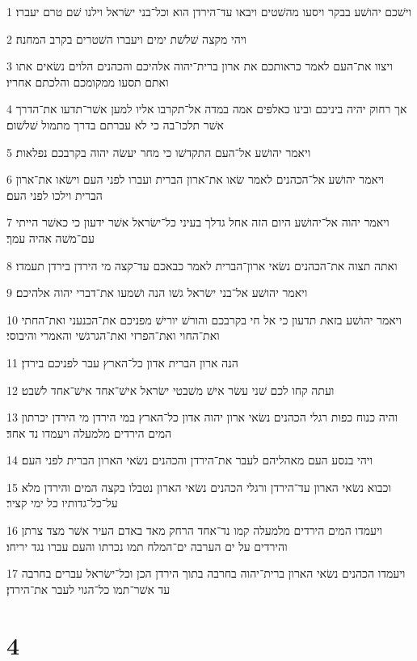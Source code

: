 \par 1 וישׁכם יהושׁע בבקר ויסעו מהשׁטים ויבאו עד־הירדן הוא וכל־בני ישׂראל וילנו שׁם טרם יעברו׃
\par 2 ויהי מקצה שׁלשׁת ימים ויעברו השׁטרים בקרב המחנה׃
\par 3 ויצוו את־העם לאמר כראותכם את ארון ברית־יהוה אלהיכם והכהנים הלוים נשׂאים אתו ואתם תסעו ממקומכם והלכתם אחריו׃
\par 4 אך רחוק יהיה ביניכם ובינו כאלפים אמה במדה אל־תקרבו אליו למען אשׁר־תדעו את־הדרך אשׁר תלכו־בה כי לא עברתם בדרך מתמול שׁלשׁום׃
\par 5 ויאמר יהושׁע אל־העם התקדשׁו כי מחר יעשׂה יהוה בקרבכם נפלאות׃
\par 6 ויאמר יהושׁע אל־הכהנים לאמר שׂאו את־ארון הברית ועברו לפני העם וישׂאו את־ארון הברית וילכו לפני העם׃
\par 7 ויאמר יהוה אל־יהושׁע היום הזה אחל גדלך בעיני כל־ישׂראל אשׁר ידעון כי כאשׁר הייתי עם־משׁה אהיה עמך׃
\par 8 ואתה תצוה את־הכהנים נשׂאי ארון־הברית לאמר כבאכם עד־קצה מי הירדן בירדן תעמדו׃
\par 9 ויאמר יהושׁע אל־בני ישׂראל גשׁו הנה ושׁמעו את־דברי יהוה אלהיכם׃
\par 10 ויאמר יהושׁע בזאת תדעון כי אל חי בקרבכם והורשׁ יורישׁ מפניכם את־הכנעני ואת־החתי ואת־החוי ואת־הפרזי ואת־הגרגשׁי והאמרי והיבוסי׃
\par 11 הנה ארון הברית אדון כל־הארץ עבר לפניכם בירדן׃
\par 12 ועתה קחו לכם שׁני עשׂר אישׁ משׁבטי ישׂראל אישׁ־אחד אישׁ־אחד לשׁבט׃
\par 13 והיה כנוח כפות רגלי הכהנים נשׂאי ארון יהוה אדון כל־הארץ במי הירדן מי הירדן יכרתון המים הירדים מלמעלה ויעמדו נד אחד׃
\par 14 ויהי בנסע העם מאהליהם לעבר את־הירדן והכהנים נשׂאי הארון הברית לפני העם׃
\par 15 וכבוא נשׂאי הארון עד־הירדן ורגלי הכהנים נשׂאי הארון נטבלו בקצה המים והירדן מלא על־כל־גדותיו כל ימי קציר׃
\par 16 ויעמדו המים הירדים מלמעלה קמו נד־אחד הרחק מאד באדם העיר אשׁר מצד צרתן והירדים על ים הערבה ים־המלח תמו נכרתו והעם עברו נגד יריחו׃
\par 17 ויעמדו הכהנים נשׂאי הארון ברית־יהוה בחרבה בתוך הירדן הכן וכל־ישׂראל עברים בחרבה עד אשׁר־תמו כל־הגוי לעבר את־הירדן׃

\chapter{4}

